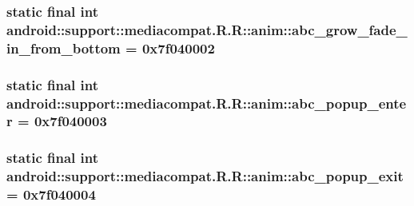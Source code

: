 \hypertarget{classandroid_1_1support_1_1mediacompat_1_1_r_1_1anim_23f5ba415b735cd72c4eaaa98c4c9033}{
\subsubsection[{abc\_\-grow\_\-fade\_\-in\_\-from\_\-bottom}]{\setlength{\rightskip}{0pt plus 5cm}static final int android::support::mediacompat.R.R::anim::abc\_\-grow\_\-fade\_\-in\_\-from\_\-bottom = 0x7f040002}}
\label{classandroid_1_1support_1_1mediacompat_1_1_r_1_1anim_23f5ba415b735cd72c4eaaa98c4c9033}


\hypertarget{classandroid_1_1support_1_1mediacompat_1_1_r_1_1anim_7d355a86b10f16046323c5c31e0f5bea}{
\subsubsection[{abc\_\-popup\_\-enter}]{\setlength{\rightskip}{0pt plus 5cm}static final int android::support::mediacompat.R.R::anim::abc\_\-popup\_\-enter = 0x7f040003}}
\label{classandroid_1_1support_1_1mediacompat_1_1_r_1_1anim_7d355a86b10f16046323c5c31e0f5bea}


\hypertarget{classandroid_1_1support_1_1mediacompat_1_1_r_1_1anim_42636d9de179afc6340eafdbe05bcf1d}{
\subsubsection[{abc\_\-popup\_\-exit}]{\setlength{\rightskip}{0pt plus 5cm}static final int android::support::mediacompat.R.R::anim::abc\_\-popup\_\-exit = 0x7f040004}}
\label{classandroid_1_1support_1_1mediacompat_1_1_r_1_1anim_42636d9de179afc6340eafdbe05bcf1d}


